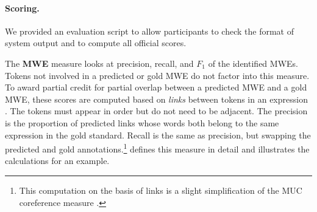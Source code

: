 \documentclass[11pt,letterpaper]{article}
\newcommand{\ensuretext}[1]{#1}
\newcommand{\nssmarker}{\ensuretext{\textcolor{magenta}{\ensuremath{^{\textsc{NS}}_{\textsc{S}}}}}}
\newcommand{\dhmarker}{\ensuretext{\textcolor{red}{\ensuremath{^{\textsc{D}}_{\textsc{H}}}}}}
\newcommand{\arkcomment}[3]{\ensuretext{\textcolor{#3}{[#1 #2]}}}
\newcommand{\nss}[1]{\arkcomment{\nssmarker}{#1}{magenta}}
\newcommand{\dirk}[1]{\arkcomment{\dhmarker}{#1}{red}}
\newcommand{\longversion}[1]{#1} %
\begin{document}

\paragraph{Scoring.}
We provided an evaluation script to allow participants to check the format of system output and to compute all official scores.

The \textbf{MWE} measure looks at precision, recall, and $F_1$ 
of the identified MWEs. Tokens not involved in a predicted or gold MWE
do not factor into this measure. 
To award partial credit for partial overlap between a predicted MWE 
and a gold MWE, these scores are computed based on \emph{links} between tokens in an expression \citep{schneider-14}. The tokens must appear in order but do not need to be adjacent.
The precision is the proportion of predicted links whose words 
both belong to the same expression in the gold standard. 
Recall is the same as precision, but swapping the predicted and gold annotations.\longversion{\footnote{This computation on the basis of links 
is a slight simplification of the MUC coreference measure \citep{vilain-95}.}}
 defines this measure in detail and illustrates the calculations for an example.

\end{document}
